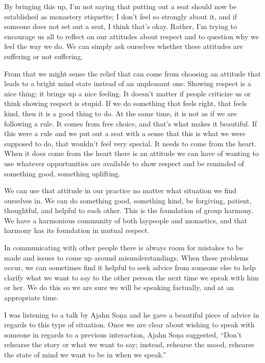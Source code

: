 By bringing this up, I'm not saying that putting out a seat should now 
be established as monastery etiquette; I don't feel so strongly about 
it, and if someone does not set out a seat, I think that's okay. 
Rather, I'm trying to encourage us all to reflect on our attitudes 
about respect and to question why we feel the way we do. We can simply 
ask ourselves whether these attitudes are suffering or not suffering.

From that we might sense the relief that can come from choosing an 
attitude that leads to a bright mind state instead of an unpleasant 
one. Showing respect is a nice thing; it brings up a nice feeling. It 
doesn't matter if people criticize us or think showing respect is 
stupid. If we do something that feels right, that feels kind, then it 
is a good thing to do. At the same time, it is not as if we are 
following a rule. It comes from free choice, and that's what makes it 
beautiful. If this were a rule and we put out a seat with a sense that 
this is what we were supposed to do, that wouldn't feel very special. 
It needs to come from the heart. When it does come from the heart there 
is an attitude we can have of wanting to use whatever opportunities are 
available to show respect and be reminded of something good, something 
uplifting.

We can use that attitude in our practice no matter what situation we 
find ourselves in. We can do something good, something kind, be 
forgiving, patient, thoughtful, and helpful to each other. This is the 
foundation of group harmony. We have a harmonious community of both 
laypeople and monastics, and that harmony has its foundation in mutual 
respect.


In communicating with other people there is always room for mistakes to 
be made and issues to come up around misunderstandings. When these 
problems occur, we can sometimes find it helpful to seek advice from 
someone else to help clarify what we want to say to the other person 
the next time we speak with him or her. We do this so we are sure we 
will be speaking factually, and at an appropriate time.

I was listening to a talk by Ajahn Soṇa and he gave a beautiful piece 
of advice in regards to this type of situation. Once we are clear about 
wishing to speak with someone in regards to a previous interaction, 
Ajahn Soṇa suggested, ``Don't rehearse the story or what we want to 
say; instead, rehearse the mood, rehearse the state of mind we want to 
be in when we speak.''

